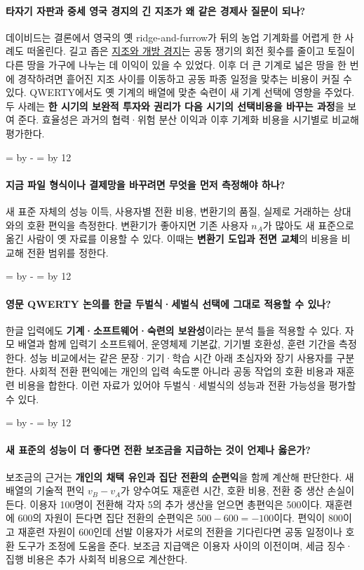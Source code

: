 \documentclass[10pt,a4paper]{article}
\newcommand{\ReserveQuestionSpace}{%
  \par\begingroup
  \dimen0=\pagegoal \advance\dimen0 by -\pagetotal
  \dimen2=\baselineskip \multiply\dimen2 by 12
  \ifdim\dimen0<\dimen2 \newpage\fi
  \endgroup}
\begin{document}
\paragraph{타자기 자판과 중세 영국 경지의 긴 지조가 왜 같은 경제사 질문이 되나?}
데이비드는 결론에서 영국의 옛 ridge-and-furrow가 뒤의 농업 기계화를 어렵게 한 사례도 떠올린다. 길고 좁은 \href{https://gohyunsu.github.io/economic-history/lecture/260923.html\#s035}{지조와 개방 경지}는 공동 쟁기의 회전 횟수를 줄이고 토질이 다른 땅을 가구에 나누는 데 이익이 있을 수 있었다. 이후 더 큰 기계로 넓은 땅을 한 번에 경작하려면 흩어진 지조 사이를 이동하고 공동 파종 일정을 맞추는 비용이 커질 수 있다. QWERTY에서도 옛 기계의 배열에 맞춘 숙련이 새 기계 선택에 영향을 주었다. 두 사례는 \textbf{한 시기의 보완적 투자와 권리가 다음 시기의 선택비용을 바꾸는 과정}을 보여 준다. 효율성은 과거의 협력·위험 분산 이익과 이후 기계화 비용을 시기별로 비교해 평가한다.\par

\ReserveQuestionSpace
\paragraph{지금 파일 형식이나 결제망을 바꾸려면 무엇을 먼저 측정해야 하나?}
새 표준 자체의 성능 이득, 사용자별 전환 비용, 변환기의 품질, 실제로 거래하는 상대와의 호환 편익을 측정한다. 변환기가 좋아지면 기존 사용자 $n_A$가 많아도 새 표준으로 옮긴 사람이 옛 자료를 이용할 수 있다. 이때는 \textbf{변환기 도입과 전면 교체}의 비용을 비교해 전환 범위를 정한다.\par

\ReserveQuestionSpace
\paragraph{영문 QWERTY 논의를 한글 두벌식·세벌식 선택에 그대로 적용할 수 있나?}
한글 입력에도 \textbf{기계·소프트웨어·숙련의 보완성}이라는 분석 틀을 적용할 수 있다. 자모 배열과 함께 입력기 소프트웨어, 운영체제 기본값, 기기별 호환성, 훈련 기간을 측정한다. 성능 비교에서는 같은 문장·기기·학습 시간 아래 초심자와 장기 사용자를 구분한다. 사회적 전환 편익에는 개인의 입력 속도뿐 아니라 공동 작업의 호환 비용과 재훈련 비용을 합한다. 이런 자료가 있어야 두벌식·세벌식의 성능과 전환 가능성을 평가할 수 있다.\par

\ReserveQuestionSpace
\paragraph{새 표준의 성능이 더 좋다면 전환 보조금을 지급하는 것이 언제나 옳은가?}
보조금의 근거는 \textbf{개인의 채택 유인과 집단 전환의 순편익}을 함께 계산해 판단한다. 새 배열의 기술적 편익 $v_B-v_A$가 양수여도 재훈련 시간, 호환 비용, 전환 중 생산 손실이 든다. 이용자 100명이 전환해 각자 5의 추가 생산을 얻으면 총편익은 500이다. 재훈련에 600의 자원이 든다면 집단 전환의 순편익은 $500-600=-100$이다. 편익이 800이고 재훈련 자원이 600인데 선발 이용자가 서로의 전환을 기다린다면 공동 일정이나 호환 도구가 조정에 도움을 준다. 보조금 지급액은 이용자 사이의 이전이며, 세금 징수·집행 비용은 추가 사회적 비용으로 계산한다.\par
\end{document}

